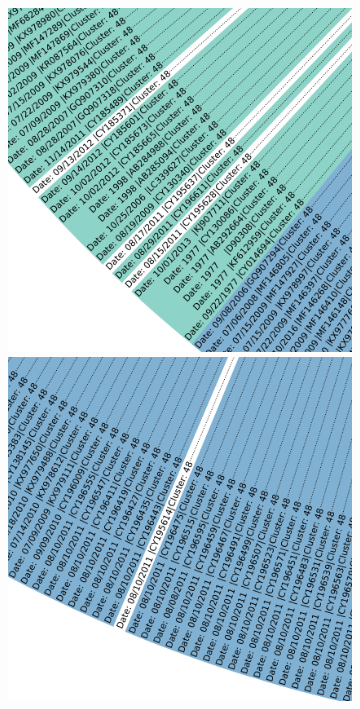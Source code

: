 \begin{figure}[!hbt]
\begin{subfigure}[t]{0.38\textwidth}
    \end{subfigure}
    \hfill
    \begin{subfigure}[t]{0.19\textwidth}
        \caption{}
        \includegraphics[width=\textwidth]{Graphics/unclassi_blue.pdf}
        \\[1mm]
        \includegraphics[width=\textwidth]{Graphics/unclassi_green.pdf}
    \end{subfigure}   
    \caption[]{}
    \label{fig:}
\end{figure}

